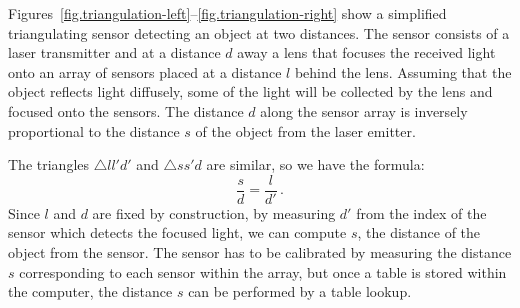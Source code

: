 \begin{figure}
\subfigures
\begin{minipage}{\textwidth}
\hspace{\fill}
\end{minipage}
\end{figure}

Figures~\ref{fig.triangulation-left}--\ref{fig.triangulation-right} show a simplified triangulating sensor detecting an object at two distances. The sensor consists of a laser transmitter and at a distance $d$ away a lens that focuses the received light onto an array of sensors placed at a distance $l$ behind the lens. Assuming that the object reflects light diffusely, some of the light will be collected by the lens and focused onto the sensors. The distance $d$ along the sensor array is inversely proportional to the distance $s$ of the object from the laser emitter.

The triangles $\triangle ll'd'$ and $\triangle ss'd$ are similar, so we have the formula:
\[
\frac{s}{d} = \frac{l}{d'}\,.
\]
Since $l$ and $d$ are fixed by construction, by measuring $d'$ from the index of the sensor which detects the focused light, we can compute $s$, the distance of the object from the sensor. The sensor has to be calibrated by measuring the distance $s$ corresponding to each sensor within the array, but once a table is stored within the computer, the distance $s$ can be performed by a table lookup.

